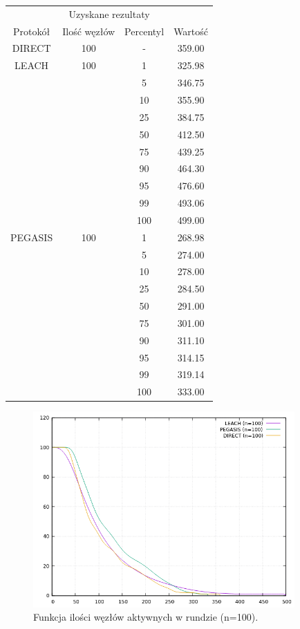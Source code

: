 \documentclass[a4paper,12pt,twoside,openany]{report}
\begin{document}
\begin{longtable}{*{4}{c}}
\toprule
\multicolumn{4}{c}{Uzyskane rezultaty} \\
Protokół	& Ilość węzłów	& Percentyl	& Wartość \\
\midrule
\endhead
DIRECT	& 100 	& -	& 359.00 \\*
\midrule
LEACH	& 100	& 1	& 325.98 \\*
	&	& 5	& 346.75 \\*
	&	& 10	& 355.90 \\*
	&	& 25	& 384.75 \\*
	&	& 50	& 412.50 \\*
	&	& 75	& 439.25 \\*
	&	& 90	& 464.30 \\*
	&	& 95	& 476.60 \\*
	&	& 99	& 493.06 \\*
	&	& 100	& 499.00 \\*
\midrule
PEGASIS	& 100	& 1	& 268.98 \\*
	&	& 5	& 274.00 \\*
	&	& 10	& 278.00 \\*
	&	& 25	& 284.50 \\*
	&	& 50	& 291.00 \\*
	&	& 75	& 301.00 \\*
	&	& 90	& 311.10 \\*
	&	& 95	& 314.15 \\*
	&	& 99	& 319.14 \\*
	&	& 100	& 333.00 \\*
\bottomrule
\end{longtable}

\begin{figure}[H]
 \centering
 \includegraphics[width=10cm]{images/gnuplot/test_2/nodes_in_round_100.png}
 \caption{Funkcja ilości węzłów aktywnych w rundzie (n=100).}
\end{figure}
\end{document}
